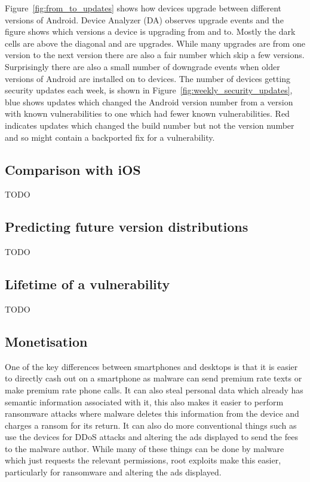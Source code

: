 \documentclass[conference,a4paper,twoside]{IEEEtran}
\begin{document}
Figure~\ref{fig:from_to_updates} shows how devices upgrade between different versions of Android.
Device Analyzer (DA) observes upgrade events and the figure shows which versions a device is upgrading from and to.
Mostly the dark cells are above the diagonal and are upgrades.
While many upgrades are from one version to the next version there are also a fair number which skip a few versions.
Surprisingly there are also a small number of downgrade events when older versions of Android are installed on to devices.
The number of devices getting security updates each week, is shown in Figure~\ref{fig:weekly_security_updates}, blue shows updates which changed the Android version number from a version with known vulnerabilities to one which had fewer known vulnerabilities.
Red indicates updates which changed the build number but not the version number and so might contain a backported fix for a vulnerability.





\subsection{Comparison with iOS}
TODO

\subsection{Predicting future version distributions}
TODO

\subsection{Lifetime of a vulnerability}
TODO

\subsection{Monetisation}
One of the key differences between smartphones and desktops is that it is easier to directly cash out on a smartphone as malware can send premium rate texts or make premium rate phone calls.
It can also steal personal data which already has semantic information associated with it, this also makes it easier to perform ransomware attacks where malware deletes this information from the device and charges a ransom for its return.
It can also do more conventional things such as use the devices for DDoS attacks and altering the ads displayed to send the fees to the malware author.
While many of these things can be done by malware which just requests the relevant permissions, root exploits make this easier, particularly for ransomware and altering the ads displayed.
\end{document}
